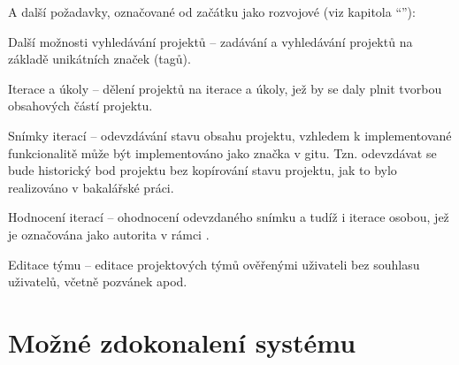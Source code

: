 A další požadavky, označované od začátku jako rozvojové (viz kapitola \enquote{}):


\begin{dl}
   \item[Další možnosti vyhledávání projektů] – zadávání a vyhledávání projektů na základě unikátních značek (tagů).
   \item[Iterace a úkoly] – dělení projektů na iterace a úkoly, jež by se daly plnit tvorbou obsahových částí projektu.
   \item[Snímky iterací] – odevzdávání stavu obsahu projektu, vzhledem k implementované funkcionalitě může být implementováno jako značka v gitu.
   Tzn.
   odevzdávat se bude historický bod projektu bez kopírování stavu projektu, jak to bylo realizováno v bakalářské práci.
   \item[Hodnocení iterací] – ohodnocení odevzdaného snímku a tudíž i iterace osobou, jež je označována jako autorita v rámci .
   \item[Editace týmu] – editace projektových týmů ověřenými uživateli bez souhlasu uživatelů, včetně pozvánek apod.
\end{dl}


\newpage



\section{Možné zdokonalení systému}\label{sec:improvements}


